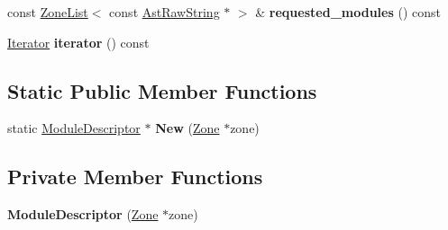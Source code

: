 \begin{DoxyCompactItemize}
\item 
const \hyperlink{classv8_1_1internal_1_1_zone_list}{Zone\+List}$<$ const \hyperlink{classv8_1_1internal_1_1_ast_raw_string}{Ast\+Raw\+String} $\ast$ $>$ \& {\bfseries requested\+\_\+modules} () const \hypertarget{classv8_1_1internal_1_1_module_descriptor_a10a55f394684a0fdfd980809d4e96322}{}\label{classv8_1_1internal_1_1_module_descriptor_a10a55f394684a0fdfd980809d4e96322}

\item 
\hyperlink{classv8_1_1internal_1_1_module_descriptor_1_1_iterator}{Iterator} {\bfseries iterator} () const \hypertarget{classv8_1_1internal_1_1_module_descriptor_aaf04cff1c21be427349aa51c5b21113a}{}\label{classv8_1_1internal_1_1_module_descriptor_aaf04cff1c21be427349aa51c5b21113a}

\end{DoxyCompactItemize}
\subsection*{Static Public Member Functions}
\begin{DoxyCompactItemize}
\item 
static \hyperlink{classv8_1_1internal_1_1_module_descriptor}{Module\+Descriptor} $\ast$ {\bfseries New} (\hyperlink{classv8_1_1internal_1_1_zone}{Zone} $\ast$zone)\hypertarget{classv8_1_1internal_1_1_module_descriptor_a6c1f76a21d4f4da347446f916b70e2ec}{}\label{classv8_1_1internal_1_1_module_descriptor_a6c1f76a21d4f4da347446f916b70e2ec}

\end{DoxyCompactItemize}
\subsection*{Private Member Functions}
\begin{DoxyCompactItemize}
\item 
{\bfseries Module\+Descriptor} (\hyperlink{classv8_1_1internal_1_1_zone}{Zone} $\ast$zone)\hypertarget{classv8_1_1internal_1_1_module_descriptor_aa9a5266f9aafaf52e3bf90d3ce3732cb}{}\label{classv8_1_1internal_1_1_module_descriptor_aa9a5266f9aafaf52e3bf90d3ce3732cb}

\end{DoxyCompactItemize}
